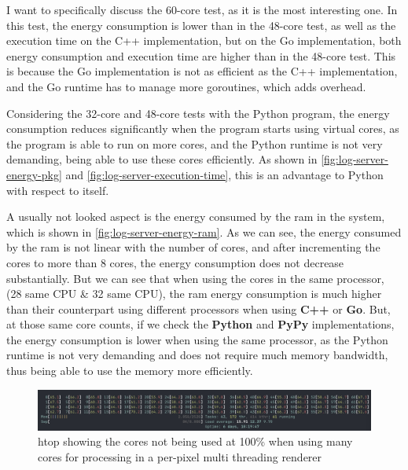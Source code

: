 I want to specifically discuss the 60-core test, as it is the most interesting one. In this test, the energy consumption is lower than in the 48-core test, as well as the execution time on the C++ implementation, but on the Go implementation, both energy consumption and execution time are higher than in the 48-core test. This is because the Go implementation is not as efficient as the C++ implementation, and the Go runtime has to manage more goroutines, which adds overhead.

Considering the 32-core and 48-core tests with the Python program, the energy consumption reduces significantly when the program starts using virtual cores, as the program is able to run on more cores, and the Python runtime is not very demanding, being able to use these cores efficiently. As shown in \autoref{fig:log-server-energy-pkg} and \autoref{fig:log-server-execution-time}, this is an advantage to Python with respect to itself.


A usually not looked aspect is the energy consumed by the \gls{ram} in the system, which is shown in \autoref{fig:log-server-energy-ram}. As we can see, the energy consumed by the \gls{ram} is not linear with the number of cores, and after incrementing the cores to more than $8$ cores, the energy consumption does not decrease substantially. But we can see that when using the cores in the same processor, (28 same CPU \& 32 same CPU), the \gls{ram} energy consumption is much higher than their counterpart using different processors when using \textbf{C++} or \textbf{Go}. But, at those same core counts, if we check the \textbf{Python} and \textbf{PyPy} implementations, the energy consumption is lower when using the same processor, as the Python runtime is not very demanding and does not require much memory bandwidth, thus being able to use the memory more efficiently.



\begin{figure}
    \centering
    \includegraphics[width=1\linewidth]{img/htop_not_running_100_60_cores.png}
    \caption[Core usage per pixel renderer]{\gls{htop} showing the cores not being used at 100\% when using many cores for processing in a per-pixel multi threading renderer }
    \label{fig:htop_60_not_100}
\end{figure}


